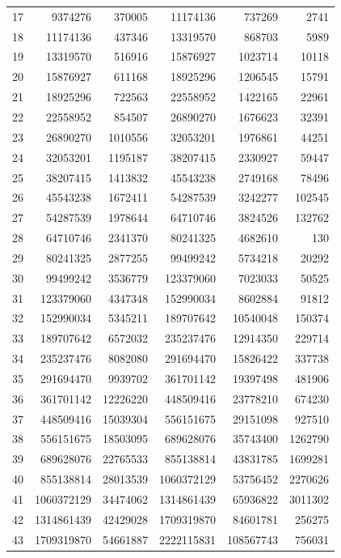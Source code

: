 \documentclass[11pt,a4paper]{article}
\theoremstyle{definition}
\begin{document}
{\begin{longtable}{rrrrrr}
17 & 9374276 & 370005 & 11174136 & 737269 & 2741 \\
18 & 11174136 & 437346 & 13319570 & 868703 & 5989 \\
19 & 13319570 & 516916 & 15876927 & 1023714 & 10118 \\
20 & 15876927 & 611168 & 18925296 & 1206545 & 15791 \\
21 & 18925296 & 722563 & 22558952 & 1422165 & 22961 \\
22 & 22558952 & 854507 & 26890270 & 1676623 & 32391 \\
23 & 26890270 & 1010556 & 32053201 & 1976861 & 44251 \\
24 & 32053201 & 1195187 & 38207415 & 2330927 & 59447 \\
25 & 38207415 & 1413832 & 45543238 & 2749168 & 78496 \\
26 & 45543238 & 1672411 & 54287539 & 3242277 & 102545 \\
27 & 54287539 & 1978644 & 64710746 & 3824526 & 132762 \\
28 & 64710746 & 2341370 & 80241325 & 4682610 & 130 \\
29 & 80241325 & 2877255 & 99499242 & 5734218 & 20292 \\
30 & 99499242 & 3536779 & 123379060 & 7023033 & 50525 \\
31 & 123379060 & 4347348 & 152990034 & 8602884 & 91812 \\
32 & 152990034 & 5345211 & 189707642 & 10540048 & 150374 \\
33 & 189707642 & 6572032 & 235237476 & 12914350 & 229714 \\
34 & 235237476 & 8082080 & 291694470 & 15826422 & 337738 \\
35 & 291694470 & 9939702 & 361701142 & 19397498 & 481906 \\
36 & 361701142 & 12226220 & 448509416 & 23778210 & 674230 \\
37 & 448509416 & 15039304 & 556151675 & 29151098 & 927510 \\
38 & 556151675 & 18503095 & 689628076 & 35743400 & 1262790 \\
39 & 689628076 & 22765533 & 855138814 & 43831785 & 1699281 \\
40 & 855138814 & 28013539 & 1060372129 & 53756452 & 2270626 \\
41 & 1060372129 & 34474062 & 1314861439 & 65936822 & 3011302 \\
42 & 1314861439 & 42429028 & 1709319870 & 84601781 & 256275 \\
43 & 1709319870 & 54661887 & 2222115831 & 108567743 & 756031 \\

\end{longtable}}
\end{document}
